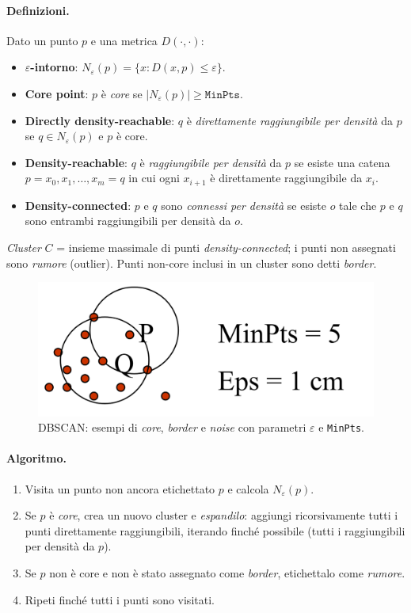 \paragraph{Definizioni.}
Dato un punto $p$ e una metrica $D(\cdot,\cdot)$:
\begin{itemize}
  \item \textbf{$\varepsilon$-intorno}: $N_\varepsilon(p)=\{x: D(x,p)\le\varepsilon\}$.
  \item \textbf{Core point}: $p$ è \emph{core} se $|N_\varepsilon(p)|\ge \texttt{MinPts}$.
  \item \textbf{Directly density-reachable}: $q$ è \emph{direttamente raggiungibile per densità} da $p$ se $q\in N_\varepsilon(p)$ e $p$ è core.
  \item \textbf{Density-reachable}: $q$ è \emph{raggiungibile per densità} da $p$ se esiste una catena $p=x_0,x_1,\dots,x_m=q$ in cui ogni $x_{i+1}$ è direttamente raggiungibile da $x_i$.
  \item \textbf{Density-connected}: $p$ e $q$ sono \emph{connessi per densità} se esiste $o$ tale che $p$ e $q$ sono entrambi raggiungibili per densità da $o$.
\end{itemize}
\emph{Cluster} $C$ = insieme massimale di punti \emph{density-connected}; i punti non assegnati sono \emph{rumore} (outlier). Punti non-core inclusi in un cluster sono detti \emph{border}.

\begin{figure}[htbp]
  \centering
  \includegraphics[width=.68\textwidth]{images/dbscan_core.png}
  \caption{DBSCAN: esempi di \emph{core}, \emph{border} e \emph{noise} con parametri $\varepsilon$ e \texttt{MinPts}.}
  \label{fig:dbscan-core}
\end{figure}

\paragraph{Algoritmo.}
\begin{enumerate}
  \item Visita un punto non ancora etichettato $p$ e calcola $N_\varepsilon(p)$.
  \item Se $p$ è \emph{core}, crea un nuovo cluster e \emph{espandilo}: aggiungi ricorsivamente tutti i punti direttamente raggiungibili, iterando finché possibile (tutti i raggiungibili per densità da $p$).
  \item Se $p$ non è core e non è stato assegnato come \emph{border}, etichettalo come \emph{rumore}.
  \item Ripeti finché tutti i punti sono visitati.
\end{enumerate}

